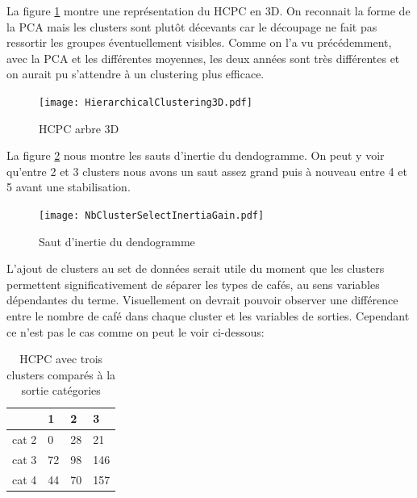 \noindent La figure \ref{HCT_3d} montre une représentation du HCPC en 3D. On reconnait la forme de la PCA mais les clusters sont plutôt décevants car le découpage ne fait pas ressortir les groupes éventuellement visibles. Comme on l'a vu précédemment, avec la PCA et les différentes moyennes, les deux années sont très différentes et on aurait pu s'attendre à un clustering plus efficace. 

\begin{figure}[H]
	\texttt{[image: HierarchicalClustering3D.pdf]}
	\caption{\label{HCT_3d} HCPC arbre 3D}
\end{figure}


\noindent La figure \ref{HCT_Inert} nous montre les sauts d'inertie du dendogramme. On peut y voir qu'entre 2 et 3 clusters nous avons un saut assez grand puis à nouveau entre 4 et 5 avant une stabilisation. 



\begin{figure}[H]
	\texttt{[image: NbClusterSelectInertiaGain.pdf]}
	\caption{\label{HCT_Inert} Saut d'inertie du dendogramme  }
\end{figure}






\noindent L'ajout de clusters au set de données serait utile du moment que les clusters permettent significativement de séparer les types de cafés, au sens variables dépendantes du terme. Visuellement on devrait pouvoir observer une différence entre le nombre de café dans chaque cluster et les variables de sorties. Cependant ce n'est pas le cas comme on peut le voir ci-dessous: 


\begin{table}[H]
	\centering
	\label{cluster3category}
	\begin{tabular}{llll}
		 & 1  & 2  & 3   \\
		 \hline
		cat 2            & 0  & 28 & 21  \\
		cat 3            & 72 & 98 & 146 \\
		cat 4            & 44 & 70 & 157 
	\end{tabular}
	\caption{HCPC avec trois clusters comparés à la sortie catégories}
\end{table}


